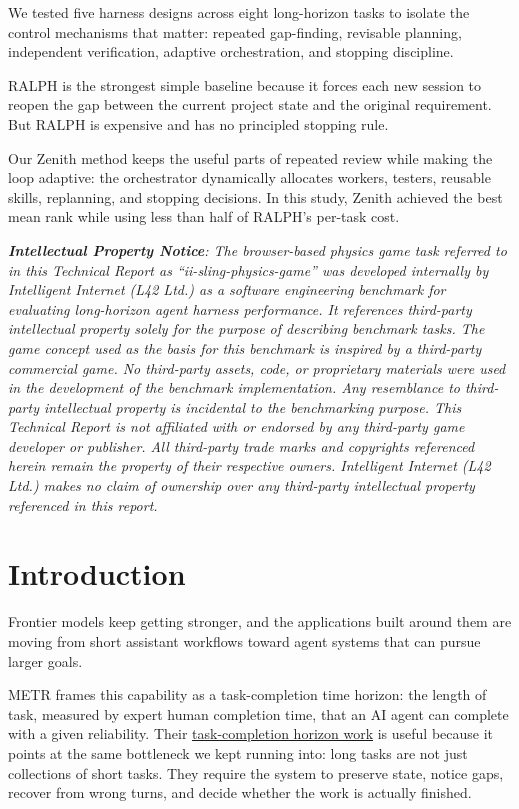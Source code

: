 \documentclass[11pt,a4paper]{article}
\newcommand{\ipnoticebody}{\textit{\textbf{Intellectual Property Notice}: The browser-based physics game task referred to in this Technical Report as ``ii-sling-physics-game'' was developed internally by Intelligent Internet (L42 Ltd.) as a software engineering benchmark for evaluating long-horizon agent harness performance. It references third-party intellectual property solely for the purpose of describing benchmark tasks. The game concept used as the basis for this benchmark is inspired by a third-party commercial game. No third-party assets, code, or proprietary materials were used in the development of the benchmark implementation. Any resemblance to third-party intellectual property is incidental to the benchmarking purpose. This Technical Report is not affiliated with or endorsed by any third-party game developer or publisher. All third-party trade marks and copyrights referenced herein remain the property of their respective owners. Intelligent Internet (L42 Ltd.) makes no claim of ownership over any third-party intellectual property referenced in this report.}}
\begin{document}
\begin{titlepage}
\begin{epigraph}
\medskip
We tested five harness designs across eight long-horizon tasks to isolate the control mechanisms that matter: repeated gap-finding, revisable planning, independent verification, adaptive orchestration, and stopping discipline.

\medskip
RALPH is the strongest simple baseline because it forces each new session to reopen the gap between the current project state and the original requirement. But RALPH is expensive and has no principled stopping rule.

\medskip
Our Zenith method keeps the useful parts of repeated review while making the loop adaptive: the orchestrator dynamically allocates workers, testers, reusable skills, replanning, and stopping decisions. In this study, Zenith achieved the best mean rank while using less than half of RALPH's per-task cost.
\end{epigraph}

\vfill

{\footnotesize\color{muted}\ipnoticebody\par}

\end{titlepage}

{
\hypersetup{linkcolor=ink}
\thispagestyle{empty}
\tableofcontents
}
\clearpage
\setcounter{page}{1}

\section{Introduction}

Frontier models keep getting stronger, and the applications built around them are moving from short assistant workflows toward agent systems that can pursue larger goals.

METR frames this capability as a task-completion time horizon: the length of task, measured by expert human completion time, that an AI agent can complete with a given reliability. Their \href{https://metr.org/time-horizons/}{task-completion horizon work} is useful because it points at the same bottleneck we kept running into: long tasks are not just collections of short tasks. They require the system to preserve state, notice gaps, recover from wrong turns, and decide whether the work is actually finished.
\end{document}
